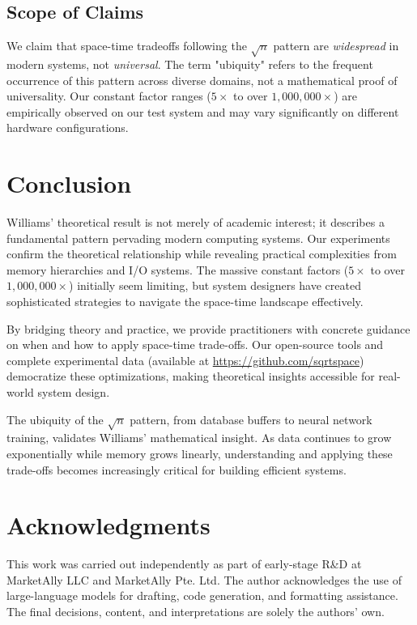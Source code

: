 \documentclass[11pt]{article}
\theoremstyle{definition}
\begin{document}
\subsection{Scope of Claims}

We claim that space-time tradeoffs following the $\sqrt{n}$ pattern are \emph{widespread} in modern systems, not \emph{universal}. The term "ubiquity" refers to the frequent occurrence of this pattern across diverse domains, not a mathematical proof of universality. Our constant factor ranges ($5\times$ to over $1{,}000{,}000\times$) are empirically observed on our test system and may vary significantly on different hardware configurations.

\section{Conclusion}

Williams' theoretical result is not merely of academic interest; it describes a fundamental pattern pervading modern computing systems. Our experiments confirm the theoretical relationship while revealing practical complexities from memory hierarchies and I/O systems. The massive constant factors ($5\times$ to over $1{,}000{,}000\times$) initially seem limiting, but system designers have created sophisticated strategies to navigate the space-time landscape effectively.

By bridging theory and practice, we provide practitioners with concrete guidance on when and how to apply space-time trade-offs. Our open-source tools and complete experimental data (available at \url{https://github.com/sqrtspace}) democratize these optimizations, making theoretical insights accessible for real-world system design.

The ubiquity of the $\sqrt{n}$ pattern, from database buffers to neural network training, validates Williams' mathematical insight. As data continues to grow exponentially while memory grows linearly, understanding and applying these trade-offs becomes increasingly critical for building efficient systems.

\section*{Acknowledgments}
This work was carried out independently as part of early-stage R\&D at MarketAlly LLC and MarketAlly Pte. Ltd. The author acknowledges the use of large-language models for drafting, code generation, and formatting assistance. The final decisions, content, and interpretations are solely the authors' own.

\newpage

\end{document}
